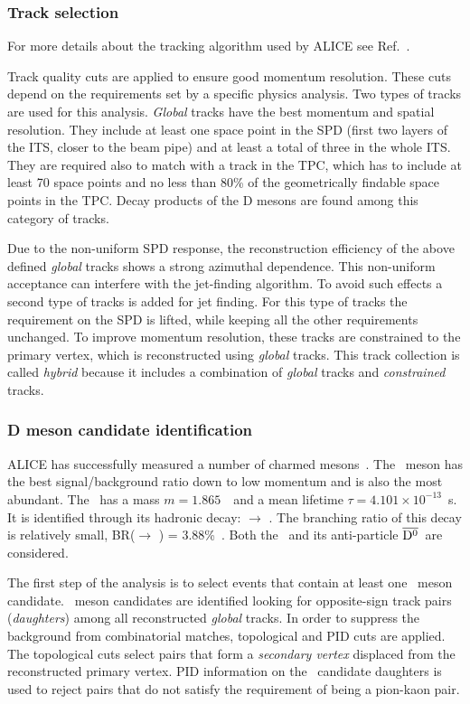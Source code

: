 \documentclass[12pt, a4paper, twoside, titlepage]{article}
\begin{document}
\subsubsection{Track selection}
For more details about the tracking algorithm used by ALICE see Ref.~\cite{ALICE:2014b}.

Track quality cuts are applied to ensure good momentum resolution. These cuts
depend on the requirements set by a specific physics analysis.
Two types of tracks are used for this analysis. \emph{Global} tracks have the best
momentum and spatial resolution. They include at least one space point in the SPD (first two
layers of the ITS, closer to the beam pipe) and at least a total of three in the whole ITS. They are required also to
match with a track in the TPC, which has to include at least 70 space points and no less than 80\% of the geometrically findable 
space points in the TPC. Decay products of the D mesons are found among this category of tracks.

Due to the non-uniform SPD response, the reconstruction efficiency of the above defined \emph{global} tracks shows a strong azimuthal dependence.
This non-uniform acceptance can interfere with the jet-finding algorithm. To avoid such effects a second type of tracks is added for jet finding.
For this type of tracks the requirement on the SPD is lifted, while keeping all the other requirements unchanged. To improve momentum resolution,
these tracks are constrained to the primary vertex, which is reconstructed using \emph{global} tracks. This track collection is called \emph{hybrid} because
it includes a combination of \emph{global} tracks and \emph{constrained} tracks.

\subsubsection{D meson candidate identification}
ALICE has successfully measured a number of charmed mesons~\cite{ALICE:2012d, ALICE:2012e}.
The \Dzero\ meson has the best signal/background ratio down to low momentum and
is also the most abundant. The \Dzero\ has a mass $m=1.865$~\GeVcsq\ and a mean lifetime $\tau=4.101 \times 10^{-13}$~s.
It is identified through its hadronic decay: \Dzero $\rightarrow$ \pip \kam. The branching ratio of this decay
is relatively small, BR(\Dzero $\rightarrow$ \pip \kam) = 3.88\%~\cite{PDG:2014}. Both the \Dzero\ and its
anti-particle $\overline{\mathrm{D^{0}}}$~are considered.

The first step of the analysis is to select events that contain at least one \Dzero\ meson candidate.
\Dzero\ meson candidates are identified looking for opposite-sign track pairs (\emph{daughters}) among all reconstructed \emph{global} tracks.
In order to suppress the background from combinatorial matches, topological and PID cuts are applied.
The topological cuts select pairs that form a \emph{secondary vertex} displaced from the reconstructed
primary vertex. 
PID information on the \Dzero\ candidate daughters is used to reject pairs that do not satisfy the requirement of being a pion-kaon pair.
\end{document}
